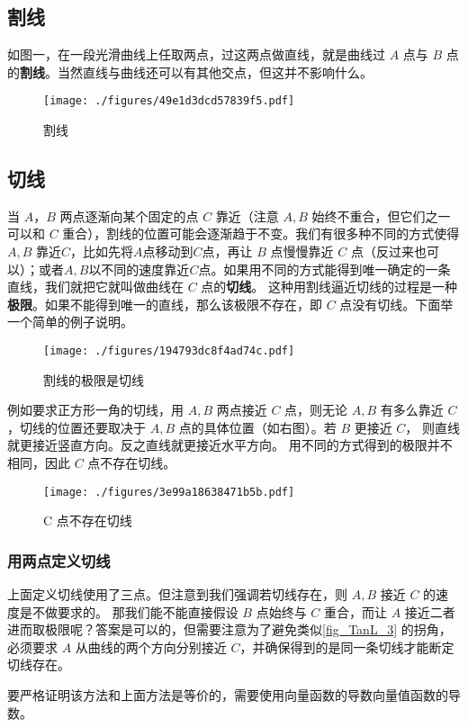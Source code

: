 


\subsection{割线}
如图一，在一段光滑曲线上任取两点，过这两点做直线，就是曲线过 $A$ 点与 $B$ 点的\textbf{割线}。当然直线与曲线还可以有其他交点，但这并不影响什么。
\begin{figure}[ht]
\centering
\texttt{[image: ./figures/49e1d3dcd57839f5.pdf]}
\caption{割线} \label{fig_TanL_1}
\end{figure}

\subsection{切线}
当 $A$，$B$ 两点逐渐向某个固定的点 $C$ 靠近（注意 $A,B$ 始终不重合，但它们之一可以和 $C$ 重合），割线的位置可能会逐渐趋于不变。我们有很多种不同的方式使得 $A, B$ 靠近$C$，比如先将$A$点移动到$C$点，再让 $B$ 点慢慢靠近 $C$ 点（反过来也可以）；或者$A, B$以不同的速度靠近$C$点。如果用不同的方式能得到唯一确定的一条直线，我们就把它就叫做曲线在 $C$ 点的\textbf{切线}。 这种用割线逼近切线的过程是一种\textbf{极限}。如果不能得到唯一的直线，那么该极限不存在，即 $C$ 点没有切线。下面举一个简单的例子说明。

\begin{figure}[ht]
\vskip 0pt
\centering
\texttt{[image: ./figures/194793dc8f4ad74c.pdf]}
\caption{割线的极限是切线} \label{fig_TanL_2}
\end{figure}
例如要求正方形一角的切线，用 $A,B$ 两点接近 $C$ 点，则无论 $A,B$ 有多么靠近 $C$，切线的位置还要取决于 $A,B$ 点的具体位置（如右图）。若 $B$ 更接近 $C$， 则直线就更接近竖直方向。反之直线就更接近水平方向。 用不同的方式得到的极限并不相同，因此 $C$ 点不存在切线。

\begin{figure}[ht]
\centering
\texttt{[image: ./figures/3e99a18638471b5b.pdf]}
\caption{C 点不存在切线} \label{fig_TanL_3}
\end{figure}

\subsubsection{用两点定义切线}
上面定义切线使用了三点。但注意到我们强调若切线存在，则 $A,B$ 接近 $C$ 的速度是不做要求的。 那我们能不能直接假设 $B$ 点始终与 $C$ 重合，而让 $A$ 接近二者进而取极限呢？答案是可以的，但需要注意为了避免类似\autoref{fig_TanL_3} 的拐角，必须要求 $A$ 从曲线的两个方向分别接近 $C$，并确保得到的是同一条切线才能断定切线存在。

要严格证明该方法和上面方法是等价的，需要使用向量函数的导数向量值函数的导数。
